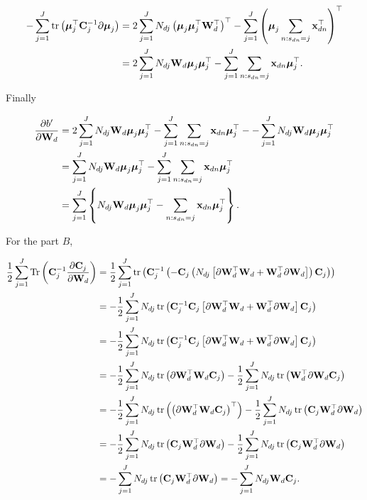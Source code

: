 \documentclass[]{article}
\newcommand{\tr}{\operatorname{tr}}
\newcommand{\Cin}{\mathbf{C}_j}
\newcommand{\muJ}{\boldsymbol{\mu}_j}
\newcommand{\indobj}{\mathbf{x}_{dn}}
\newcommand{\projMatI}{\mathbf{W}_d}
\newcommand{\dWjIn}{\partial\projMatI}
\begin{document}
\begin{align}
-\sum_{j=1}^{J}\tr\left( \muJ^\top\Cin^{-1}\partial\muJ\right) &= 2\sum_{j=1}^{J}N_{dj}\left(\muJ\muJ^\top\projMatI^\top\right)^\top-\sum_{j=1}^{J}\left(\muJ\sum_{n:s_{dn}=j}\indobj^\top\right)^\top \notag \\
&= 2\sum_{j=1}^{J}N_{dj}\projMatI\muJ\muJ^\top - \sum_{j=1}^{J}\sum_{n:s_{dn}=j}\indobj \muJ^\top .
\end{align}

Finally 

\begin{align}
\frac{\partial b'}{\dWjIn} &= 2\sum_{j=1}^{J}N_{dj}\projMatI\muJ\muJ^\top - \sum_{j=1}^{J}\sum_{n:s_{dn}=j}\indobj \muJ^\top -  -\sum_{j=1}^{J} N_{dj} \projMatI \muJ\muJ^\top \notag \\
&= \sum_{j=1}^{J}N_{dj}\projMatI\muJ\muJ^\top - \sum_{j=1}^{J}\sum_{n:s_{dn}=j}\indobj \muJ^\top \notag \\
&= \sum_{j=1}^{J}\left\{N_{dj}\projMatI\muJ\muJ^\top - \sum_{n:s_{dn}=j}\indobj \muJ^\top\right\}.
\end{align}

For the part $B$,

\begin{align}
\frac{1}{2}\sum_{j=1}^{J} \operatorname{Tr}\left(\Cin^{-1}\frac{\partial \Cin}{\dWjIn}\right) &= \frac{1}{2}\sum_{j=1}^{J} \operatorname{tr}\left(\Cin^{-1}\left(-\Cin\left(N_{dj}\left[\partial\projMatI^\top\projMatI+\projMatI^\top\partial\projMatI\right]\right)\Cin\right)\right) \notag \\
&= -\frac{1}{2}\sum_{j=1}^{J}N_{dj}\operatorname{tr}\left(\Cin^{-1}\Cin\left[\partial\projMatI^\top\projMatI+\projMatI^\top\partial\projMatI\right]\Cin\right) \notag \\
&= -\frac{1}{2}\sum_{j=1}^{J}N_{dj}\operatorname{tr}\left(\Cin^{-1}\Cin\left[\partial\projMatI^\top\projMatI+\projMatI^\top\partial\projMatI\right]\Cin\right) \notag \\
&= -\frac{1}{2}\sum_{j=1}^{J}N_{dj}\operatorname{tr}\left(\partial\projMatI^\top\projMatI\Cin\right) -\frac{1}{2}\sum_{j=1}^{J}N_{dj}\operatorname{tr}\left(\projMatI^\top\partial\projMatI\Cin\right)\notag \\
&= -\frac{1}{2}\sum_{j=1}^{J}N_{dj}\operatorname{tr}\left(\left(\partial\projMatI^\top\projMatI\Cin\right)^\top\right) -\frac{1}{2}\sum_{j=1}^{J}N_{dj}\operatorname{tr}\left(\Cin\projMatI^\top\partial\projMatI\right)\notag \\
&= -\frac{1}{2}\sum_{j=1}^{J}N_{dj}\operatorname{tr}\left(\Cin\projMatI^\top\partial\projMatI\right) -\frac{1}{2}\sum_{j=1}^{J}N_{dj}\operatorname{tr}\left(\Cin\projMatI^\top\partial\projMatI\right)\notag \\
&=-\sum_{j=1}^{J}N_{dj}\operatorname{tr}\left(\Cin\projMatI^\top\partial\projMatI\right)= -\sum_{j=1}^{J}N_{dj}\projMatI\Cin.
\end{align}
\end{document}
